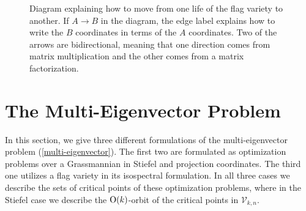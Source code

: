 \documentclass[12pt]{extarticle}
\theoremstyle{definition}
\numberwithin{theorem}{section}
\begin{document}
\begin{figure}[h]
  \begin{center}
\end{center}  
  \caption{Diagram explaining how to move from one life of the flag variety to another. If $A \to B$ in the diagram, the edge label explains how to write the $B$ coordinates in terms of the $A$ coordinates. Two of the arrows are bidirectional, meaning that one direction comes from matrix multiplication and the other comes from a matrix factorization.}\label{fig:lives}
\end{figure}

\section{The Multi-Eigenvector  Problem}\label{sec:eigenvalue}
In this section, we give three different formulations of the 
multi-eigenvector problem (\ref{multi-eigenvector}). The first two are formulated as optimization problems over a Grassmannian in Stiefel and projection coordinates. The third one utilizes a flag variety in its isospectral formulation.  In all three cases we describe the sets of critical points of these optimization problems, where in the Stiefel case we describe the ${\rm O}(k)$-orbit of the critical points in $\mathcal V_{k,n}$. 
\end{document}
